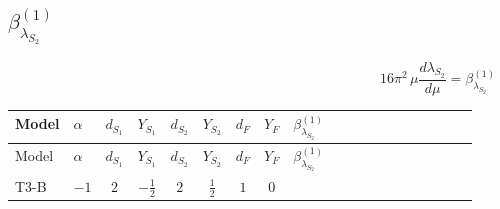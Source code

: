\documentclass{article}
\begin{document}
\begin{landscape}
\section*{$\beta_{\lambda_{S_2}}^{(1)}$}
\[16\pi^2\,\mu\frac{d \lambda_{S_2}}{d\mu}=\beta_{\lambda_{S_2}}^{(1)}\]
\tiny
\begin{longtable}{@{}llcccccc >{\raggedright\arraybackslash}p{0.54\linewidth}@{}}
\toprule
Model & $\alpha$ & $d_{S_1}$ & $Y_{S_1}$ & $d_{S_2}$ & $Y_{S_2}$ & $d_F$ & $Y_F$ & $\beta_{\lambda_{S_2}}^{(1)}$ \\
\midrule
\endfirsthead
\toprule
Model & $\alpha$ & $d_{S_1}$ & $Y_{S_1}$ & $d_{S_2}$ & $Y_{S_2}$ & $d_F$ & $Y_F$ & $\beta_{\lambda_{S_2}}^{(1)}$ \\
\midrule
\endhead
T3-B & $-1$ & $2$ & $-\frac{1}{2}$ & $2$ & $\frac{1}{2}$ & $1$ & $0$ & \scriptsize\adjustbox{max width=\linewidth}{$\begin{gathered} {\lambda_{S_1^\dagger S_2 S_2^{\dagger 2}}} (2 \operatorname{Tr}\!\left({y_1}\,\left({y_2}\right)^{\dagger}\right)+24 \left({\lambda_{S_1^\dagger S_2 S_2^{\dagger 2}}}\right)^{*}) \\ +2 \left({\lambda_{S_1^\dagger S_2 S_2^{\dagger 2}}}\right)^{*} \operatorname{Tr}\!\left({y_2}\,\left({y_1}\right)^{\dagger}\right) \\ +4 {\lambda_{S_2}} \operatorname{Tr}\!\left({y_2}\,\left({y_2}\right)^{\dagger}\right) \\ -4 \operatorname{Tr}\!\left({y_2}\,\left({y_2}\right)^{\dagger}\,{y_2}\,\left({y_2}\right)^{\dagger}\right) \\ +8 {\lambda_{H^\dagger H^\dagger S_2 S_2}} \left({\lambda_{H^\dagger H^\dagger S_2 S_2}}\right)^{*} \\ +8 {\lambda_{S_1^{\dagger 2}S_2^{\dagger 2}}} \left({\lambda_{S_1^{\dagger 2}S_2^{\dagger 2}}}\right)^{*} \\ +\frac{9 {g_2}^4}{4} \\ +{g_Y}^2 \left(\frac{3 {g_2}^2}{2}-3 {\lambda_{S_2}}\right) \\ -9 {g_2}^2 {\lambda_{S_2}} \\ +\frac{3 {g_Y}^4}{4} \\ +4 {\lambda_{12}}^2 \\ +\frac{{\lambda_{12}^{\rm Adj}}^2}{4} \\ +4 {\lambda_{H2}}^2 \\ +\frac{{\lambda_{H2}^{\rm Adj}}^2}{4} \\ +12 {\lambda_{S_2}}^2\end{gathered}$} \\

\end{longtable}
\end{landscape}
\end{document}
